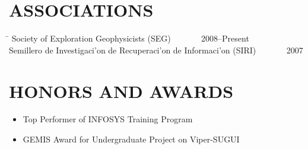 \documentclass{res}
\begin{document}
\begin{resume}
\section{ASSOCIATIONS}
    \vspace{0.05 in}    
    \begin{tabbing}
    \hspace{4.9in}\= \kill %
    Society of Exploration Geophysicists (SEG) \> ~~~~~~ 2008--Present\\
    Semillero de Investigaci\a'on de Recuperaci\a'on de Informaci\a'on (SIRI) \> ~~~~~~ 2007\\
    \end{tabbing}\vspace{-15pt}


% 

\section{HONORS AND AWARDS}      
    \begin{itemize}
    	\item Top Performer of INFOSYS Training Program
    	\item GEMIS Award for Undergraduate Project on Viper-SUGUI
    \end{itemize}


 
\end{resume}
\end{document}
